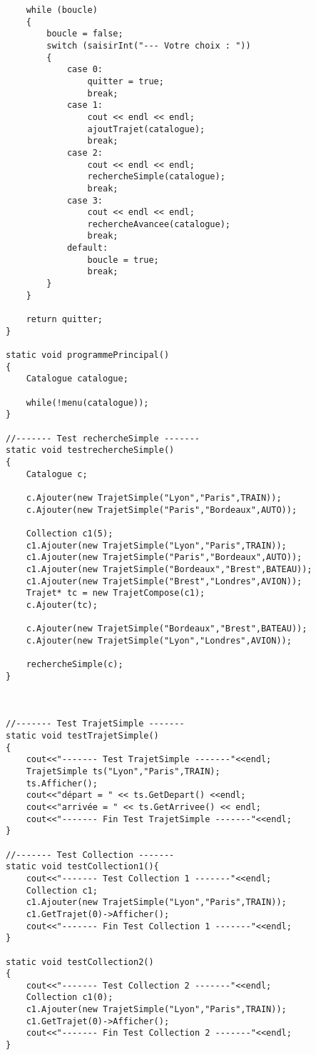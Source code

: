 \begin{verbatim}
    while (boucle)
    {
        boucle = false;
        switch (saisirInt("--- Votre choix : "))
        {
            case 0:
                quitter = true;
                break;
            case 1:
	            cout << endl << endl;
                ajoutTrajet(catalogue);
                break;
            case 2:
	            cout << endl << endl;
	            rechercheSimple(catalogue);
                break;
            case 3:
	            cout << endl << endl;
	            rechercheAvancee(catalogue);
                break;
            default:
                boucle = true;
                break;
        }
    }
    
    return quitter;
}

static void programmePrincipal()
{
    Catalogue catalogue;
    
    while(!menu(catalogue));
}

//------- Test rechercheSimple -------
static void testrechercheSimple()
{
    Catalogue c;
    
    c.Ajouter(new TrajetSimple("Lyon","Paris",TRAIN));
    c.Ajouter(new TrajetSimple("Paris","Bordeaux",AUTO));
    
    Collection c1(5);
    c1.Ajouter(new TrajetSimple("Lyon","Paris",TRAIN));
    c1.Ajouter(new TrajetSimple("Paris","Bordeaux",AUTO));
    c1.Ajouter(new TrajetSimple("Bordeaux","Brest",BATEAU));
    c1.Ajouter(new TrajetSimple("Brest","Londres",AVION));
    Trajet* tc = new TrajetCompose(c1);
    c.Ajouter(tc);
    
    c.Ajouter(new TrajetSimple("Bordeaux","Brest",BATEAU));
    c.Ajouter(new TrajetSimple("Lyon","Londres",AVION));
    
    rechercheSimple(c);
}



//------- Test TrajetSimple -------
static void testTrajetSimple()
{
    cout<<"------- Test TrajetSimple -------"<<endl;
    TrajetSimple ts("Lyon","Paris",TRAIN);
    ts.Afficher();
    cout<<"départ = " << ts.GetDepart() <<endl;
    cout<<"arrivée = " << ts.GetArrivee() << endl;
    cout<<"------- Fin Test TrajetSimple -------"<<endl;
}

//------- Test Collection -------
static void testCollection1(){
    cout<<"------- Test Collection 1 -------"<<endl;
    Collection c1;
    c1.Ajouter(new TrajetSimple("Lyon","Paris",TRAIN));
    c1.GetTrajet(0)->Afficher();
    cout<<"------- Fin Test Collection 1 -------"<<endl;
}

static void testCollection2()
{
    cout<<"------- Test Collection 2 -------"<<endl;
    Collection c1(0);
    c1.Ajouter(new TrajetSimple("Lyon","Paris",TRAIN));
    c1.GetTrajet(0)->Afficher();
    cout<<"------- Fin Test Collection 2 -------"<<endl;
}


\end{verbatim}
